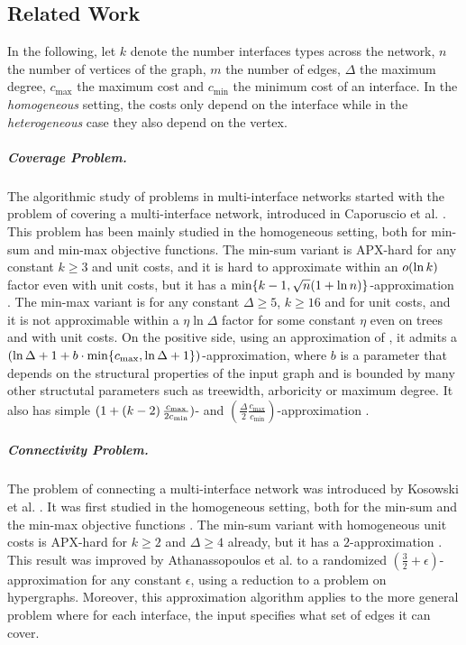 \subsection{Related Work}

In the following, let $k$ denote the number interfaces types across the network, $n$ the number of vertices of the graph, $m$ the number of edges, $\Delta$ the maximum degree, $c_{\max}$ the maximum cost and $c_{\min}$ the minimum cost of an interface. In the \emph{homogeneous} setting, the costs only depend on the interface while in the \emph{heterogeneous} case they also depend on the vertex. 

\subparagraph*{Coverage Problem.}
The algorithmic study of problems in multi-interface networks started with the problem of covering a multi-interface network, introduced in Caporuscio et al. \cite{EnergeticPerformanceOfServiceOrientedMultiRadioNetworks}. 
This problem has been mainly studied in the homogeneous setting, both for min-sum \cite{CostMinimizationInWirelessNetworks} and min-max \cite{MinimizeTheMaximumDutyInMultiInterfaceNetworks} objective functions.
The min-sum variant is APX-hard for any constant $k \geq 3$ and unit costs, and it is hard to approximate within an $o\mathopen{}\left( \ln k \right)$ factor even with unit costs, but it has a $\min \mathopen{}\left\{ k-1, \sqrt{n} \mathopen{}\left( 1+\ln n \right) \right\}$-approximation \cite{CostMinimizationInWirelessNetworks}.
The min-max variant is \NPhard for any constant $\Delta \geq 5$, $k \geq 16$ and for unit costs, and it is not approximable within a $\eta \ln \Delta$ factor for some constant $\eta$ even on trees and with unit costs. On the positive side, using an approximation of \setcover, it admits a $\mathopen{}\left( \ln \Delta +1 +b \cdot \min \mathopen{}\left\{ c_{\max}, \ln \Delta +1 \right\} \right)$-approximation, where $b$ is a parameter that depends on the structural properties of the input graph and is bounded by many other structutal parameters such as treewidth, arboricity or maximum degree. It also has simple $(1+\mathopen{}\left( k-2 \right) \frac{c_{\max}}{2 c_{\min}})$- and $(\frac{\Delta}{2} \frac{c_{\max}}{c_{\min}})$-approximation \cite{MinimizeTheMaximumDutyInMultiInterfaceNetworks}. 

\subparagraph*{Connectivity Problem.} The problem of connecting a multi-interface network was introduced by Kosowski et al. \cite{ExploitingMultiInterfaceNetworksConnectivityAndCheapestPaths}. It was first studied in the homogeneous setting, both for the min-sum \cite{ExploitingMultiInterfaceNetworksConnectivityAndCheapestPaths} and the min-max objective functions \cite{MinimizeTheMaximumDutyInMultiInterfaceNetworks}.
The min-sum variant with homogeneous unit costs is APX-hard for $k \geq 2$ and $\Delta \geq 4$ already, but it has a $2$-approximation \cite{ExploitingMultiInterfaceNetworksConnectivityAndCheapestPaths}. This result was improved by Athanassopoulos et al. \cite{EnergyEfficientCommunicationInMultiInterfaceWirelessNetworks} to a randomized $(\frac{3}{2} + \epsilon)$-approximation for any constant $\epsilon$, using a reduction to a \mst problem on hypergraphs. Moreover, this approximation algorithm applies to the more general problem where for each interface, the input specifies what set of edges it can cover.

